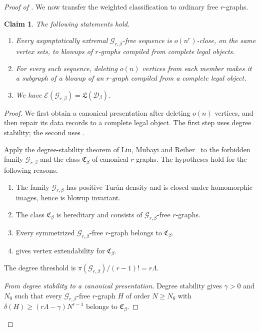 \documentclass[10pt]{article}
\numberwithin{equation}{section}
\newtheorem{claim}[claim]{Claim}\aliascntresetthe{claim}
\theoremstyle{definition}
\newcommand{\cD}{\mathcal D}\newcommand{\cE}{\mathcal E}\newcommand{\cF}{\mathcal F}
\newcommand{\cG}{\mathcal G}\newcommand{\cH}{\mathcal H}\newcommand{\cJ}{\mathcal J}
\begin{document}
\begin{proof}[Proof of ]
We now transfer the weighted classification to ordinary free $r$-graphs.
\begin{claim}\label{thm:ordinarytransfer}
The following statements hold.
\begin{enumerate}[beginpenalty=10000]
\item Every asymptotically extremal $\cG_{r,\beta}$-free sequence is $o(n^r)$-close, on the same vertex sets, to blowups of $r$-graphs compiled from complete legal objects.
\item For every such sequence, deleting $o(n)$ vertices from each member makes it a subgraph of a blowup of an $r$-graph compiled from a complete legal object.
\item We have $\cE(\cG_{r,\beta})=\mathfrak L(\cD_\beta)$.
\end{enumerate}
\end{claim}
\begin{proof}
We first obtain a canonical presentation after deleting $o(n)$ vertices, and then repair its data records to a complete legal object. The first step uses degree stability; the second uses .

Apply the degree-stability theorem of Liu, Mubayi and Reiher~\cite[Definitions 1.5--1.6 and Theorem 1.7]{LMR2023} to the forbidden family $\cG_{r,\beta}$ and the class $\mathfrak C_\beta$ of canonical $r$-graphs. The hypotheses hold for the following reasons.
\begin{enumerate}
\item The family $\cG_{r,\beta}$ has positive Tur\'an density and is closed under homomorphic images, hence is blowup invariant.
\item The class $\mathfrak C_\beta$ is hereditary and consists of $\cG_{r,\beta}$-free $r$-graphs.
\item Every symmetrized $\cG_{r,\beta}$-free $r$-graph belongs to $\mathfrak C_\beta$.
\item {} gives vertex extendability for $\mathfrak C_\beta$.
\end{enumerate}
The degree threshold is $\pi(\cG_{r,\beta})/(r-1)!=r\Lambda$.

\emph{From degree stability to a canonical presentation.} Degree stability gives $\gamma>0$ and $N_0$ such that every $\cG_{r,\beta}$-free $r$-graph $H$ of order $N\ge N_0$ with $\delta(H)\ge(r\Lambda-\gamma)N^{r-1}$ belongs to $\mathfrak C_\beta$.


\end{proof}
\end{proof}
\end{document}
